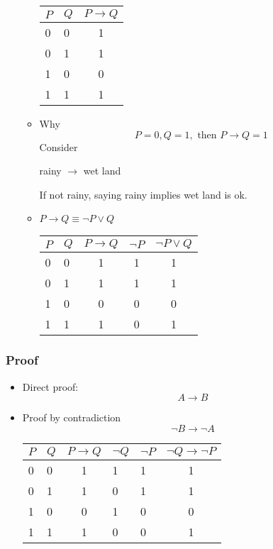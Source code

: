 \begin{frame}[allowframebreaks]
\begin{itemize}
\begin{itemize}
    \begin{center}
      \begin{tabular}{ll|c}
        $P$ & $Q$ & $P \rightarrow Q$ \\ \hline
        0& 0 & 1\\ 
        0& 1 & 1\\
        1& 0 & 0\\
        1& 1 & 1
      \end{tabular}
    \end{center}
  \item [] Why
    \begin{equation*}
      P = 0, Q = 1, \text{ then } P \rightarrow Q = 1
    \end{equation*}
Consider
\begin{center}
rainy $\rightarrow$ wet land
\end{center}
If not rainy, 
saying rainy implies wet land is ok.
\item $P \rightarrow Q \equiv 
\neg P \vee Q$
    \begin{center}
      \begin{tabular}{ll|c|cc}
        $P$ & $Q$ & $P \rightarrow Q$ & $\neg P$ & $\neg P \vee Q$\\ \hline
        0& 0 & 1 & 1 & 1\\ 
        0& 1 & 1 & 1 & 1\\
        1& 0 & 0 & 0 & 0\\
        1& 1 & 1 & 0 & 1
      \end{tabular}
    \end{center}
  \end{itemize}

\end{itemize}\end{frame} \begin{frame}[allowframebreaks] \frametitle{Proof}
  \begin{itemize}  
  \item Direct proof:
    $$A\rightarrow B$$
  \item Proof by contradiction
    $$\neg B \rightarrow \neg A$$

    \begin{center}
      \begin{tabular}{ll|c|llc}
        $P$ & $Q$ & $P \rightarrow Q$ & $\neg Q$ & $\neg P$ & $\neg Q \rightarrow \neg P$\\ \hline
        0& 0 & 1 & 1 & 1 & 1\\ 
        0& 1 & 1 & 0 & 1 & 1\\
        1& 0 & 0 & 1 & 0 & 0\\
        1& 1 & 1 & 0 & 0 & 1
      \end{tabular}
    \end{center}
    

\end{itemize}
\end{frame}

